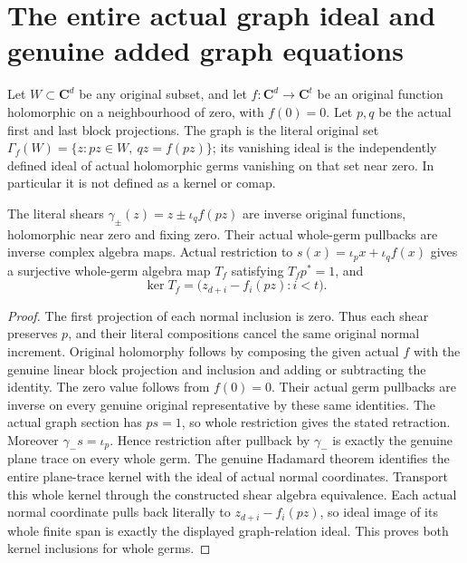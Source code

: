 \section{The entire actual graph ideal and genuine added graph equations}

Let $W\subset\mathbf C^d$ be any original subset, and let
$f:\mathbf C^d\to\mathbf C^t$ be an original function holomorphic on a
neighbourhood of zero, with $f(0)=0$. Let $p,q$ be the actual first and
last block projections. The graph is the literal original set
$\Gamma_f(W)=\{z:pz\in W,\ qz=f(pz)\}$; its vanishing ideal is the
independently defined ideal of actual holomorphic germs vanishing on that
set near zero. In particular it is not defined as a kernel or comap.

\begin{theorem}
\label{hir:actual-holomorphic-graph-whole-trace-kernel}
\leanok
The literal shears $\gamma_\pm(z)=z\pm\iota_q f(pz)$ are inverse original
functions, holomorphic near zero and fixing zero. Their actual whole-germ
pullbacks are inverse complex algebra maps. Actual restriction to
$s(x)=\iota_p x+\iota_q f(x)$ gives a surjective whole-germ algebra map
$T_f$ satisfying $T_f p^*=1$, and
\[
 \ker T_f=\bigl(z_{d+i}-f_i(pz):i<t\bigr).
\]
\end{theorem}
\begin{proof}
The first projection of each normal inclusion is zero. Thus each shear
preserves $p$, and their literal compositions cancel the same original
normal increment. Original holomorphy follows by composing the given
actual $f$ with the genuine linear block projection and inclusion and
adding or subtracting the identity. The zero value follows from $f(0)=0$.
Their actual germ pullbacks are inverse on every genuine original
representative by these same identities. The actual graph section has
$p s=1$, so whole restriction gives the stated retraction. Moreover
$\gamma_-s=\iota_p$. Hence restriction after pullback by $\gamma_-$
is exactly the genuine plane trace on every whole germ. The genuine
Hadamard theorem identifies the entire plane-trace kernel with the ideal
of actual normal coordinates. Transport this whole kernel through the
constructed shear algebra equivalence. Each actual normal coordinate
pulls back literally to $z_{d+i}-f_i(pz)$, so ideal image of its whole
finite span is exactly the displayed graph-relation ideal. This proves
both kernel inclusions for whole germs.
\end{proof}

